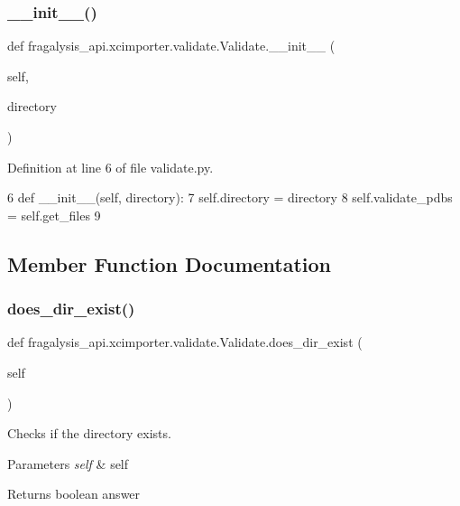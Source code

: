 \subsubsection{\texorpdfstring{\+\_\+\+\_\+init\+\_\+\+\_\+()}{\_\_init\_\_()}}
{\footnotesize\ttfamily def fragalysis\+\_\+api.\+xcimporter.\+validate.\+Validate.\+\_\+\+\_\+init\+\_\+\+\_\+ (\begin{DoxyParamCaption}\item[{}]{self,  }\item[{}]{directory }\end{DoxyParamCaption})}



Definition at line 6 of file validate.\+py.


\begin{DoxyCode}
6     \textcolor{keyword}{def }\_\_init\_\_(self, directory):
7         self.directory = directory
8         self.validate\_pdbs = self.get\_files
9 
\end{DoxyCode}


\subsection{Member Function Documentation}
\mbox{\label{classfragalysis__api_1_1xcimporter_1_1validate_1_1_validate_a885f473957a347300395920895108c64}} 
\subsubsection{\texorpdfstring{does\+\_\+dir\+\_\+exist()}{does\_dir\_exist()}}
{\footnotesize\ttfamily def fragalysis\+\_\+api.\+xcimporter.\+validate.\+Validate.\+does\+\_\+dir\+\_\+exist (\begin{DoxyParamCaption}\item[{}]{self }\end{DoxyParamCaption})}



Checks if the directory exists. 


\begin{DoxyParams}{Parameters}
{\em self} & self \\
\hline
\end{DoxyParams}
\begin{DoxyReturn}{Returns}
boolean answer 
\end{DoxyReturn}


